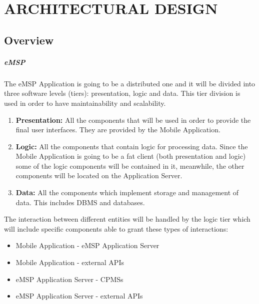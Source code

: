 \chapter{ARCHITECTURAL DESIGN}
\label{ch:architecturalDesign}%

\section{Overview}
\label{sec:overview}
\paragraph{eMSP}
The eMSP Application is going to be a distributed one and it will be divided into three software levels (tiers): presentation, logic and data. This tier division is used in order to have maintainability and scalability.
\begin{enumerate}
    \item \textbf{Presentation: }All the components that will be used in order to provide the final user interfaces. They are provided by the Mobile Application. 
    \item \textbf{Logic: }All the components that contain logic for processing data. Since the Mobile Application is going to be a fat client (both presentation and logic) some of the logic components will be contained in it, meanwhile, the other components will be located on the Application Server.
    \item \textbf{Data: }All the components which implement storage and management of data. This includes DBMS and databases.
\end{enumerate}
The interaction between different entities will be handled by the logic tier which will include specific components able to grant these types of interactions:
\begin{itemize}
    \item Mobile Application - eMSP Application Server
    \item Mobile Application - external APIs
    \item eMSP Application Server - CPMSs
    \item eMSP Application Server - external APIs
\end{itemize}
